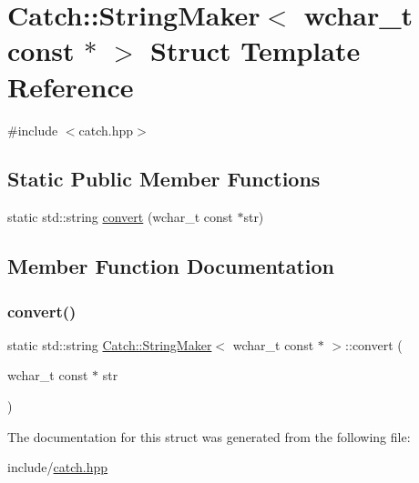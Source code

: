 \hypertarget{struct_catch_1_1_string_maker_3_01wchar__t_01const_01_5_01_4}{}\section{Catch\+::String\+Maker$<$ wchar\+\_\+t const $\ast$ $>$ Struct Template Reference}
\label{struct_catch_1_1_string_maker_3_01wchar__t_01const_01_5_01_4}


{\ttfamily \#include $<$catch.\+hpp$>$}

\subsection*{Static Public Member Functions}
\begin{DoxyCompactItemize}
\item 
static std\+::string \mbox{\hyperlink{struct_catch_1_1_string_maker_3_01wchar__t_01const_01_5_01_4_ae7535a1f417ace45ca05e4389334ffeb}{convert}} (wchar\+\_\+t const $\ast$str)
\end{DoxyCompactItemize}


\subsection{Member Function Documentation}
\mbox{\label{struct_catch_1_1_string_maker_3_01wchar__t_01const_01_5_01_4_ae7535a1f417ace45ca05e4389334ffeb}} 
\subsubsection{\texorpdfstring{convert()}{convert()}}
{\footnotesize\ttfamily static std\+::string \mbox{\hyperlink{struct_catch_1_1_string_maker}{Catch\+::\+String\+Maker}}$<$ wchar\+\_\+t const $\ast$ $>$\+::convert (\begin{DoxyParamCaption}\item[{wchar\+\_\+t const $\ast$}]{str }\end{DoxyParamCaption})\hspace{0.3cm}{\ttfamily [static]}}



The documentation for this struct was generated from the following file\+:\begin{DoxyCompactItemize}
\item 
include/\mbox{\hyperlink{catch_8hpp}{catch.\+hpp}}\end{DoxyCompactItemize}
